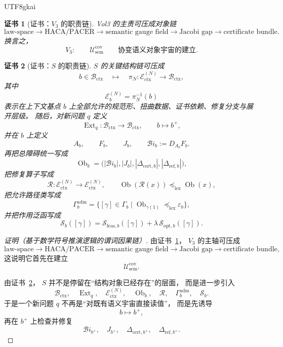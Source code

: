 \documentclass[12pt]{article}
\newtheorem{Certificate}{证书}[section]
\begin{document}
\begin{CJK*}{UTF8}{gkai}
\begin{Certificate}[证书：$V_3$ 的职责链]
\label{cert:tex37-ch20-v3-role}
Vol3 的主责可压成对象链
\[
  \text{law-space}
  \to
  \text{HACA/PACER}
  \to
  \text{semantic gauge field}
  \to
  \text{Jacobi gap}
  \to
  \text{certificate bundle}.
\]
换言之，
\[
  V_3:
  \qquad
  \mathcal U_{\mathrm{sem}}^{\mathrm{cov}}
  \qquad
  \text{协变语义对象宇宙的建立}.
\]
\end{Certificate}

\begin{Certificate}[证书：$S$ 的职责链]
\label{cert:tex37-ch20-s-role}
$S$ 的关键结构链可压成
\[
  b\in\mathcal B_{\mathrm{ctx}}
  \quad\mapsto\quad
  \pi_N:\mathcal E_{\mathrm{ctx}}^{(N)}\to\mathcal B_{\mathrm{ctx}},
\]
其中
\[
  \mathcal E_b^{(N)}=\pi_N^{-1}(b)
\]
表示在上下文基点 $b$ 上全部允许的规范形、扭曲数据、证书依赖、修复分支与展开层级。
随后，对新问题 $q$ 定义
\[
  \operatorname{Ext}_q:\mathcal B_{\mathrm{ctx}}\to \mathcal B_{\mathrm{ctx}},
  \qquad
  b\mapsto b^+,
\]
并在 $b$ 上定义
\[
  A_b,\qquad
  F_b,\qquad
  J_b,\qquad
  \mathcal{B}\!i_b:=D_{A_b}F_b.
\]
再把总障碍统一写成
\[
  \operatorname{Ob}_b
  =
  \bigl(
    |\mathcal{B}\!i_b|,
    |J_b|,
    |\Delta_{\mathrm{cert},b}|,
    |\Delta_{\mathrm{ref},b}|
  \bigr),
\]
把修复算子写成
\[
  \mathcal R:\mathcal E_{\mathrm{ctx}}^{(N)}\to \mathcal E_{\mathrm{ctx}}^{(N)},
  \qquad
  \operatorname{Ob}(\mathcal R(x))
  \preceq_{\mathrm{lex}}
  \operatorname{Ob}(x),
\]
把允许路径类写成
\[
  \Gamma_b^{\mathrm{adm}}
  =
  \bigl\{
    [\gamma]\in\Gamma_b
    \mid
    \operatorname{Ob}_{\gamma(1)}
    \preceq_{\mathrm{lex}}
    \varepsilon_b
  \bigr\},
\]
并把作用泛函写成
\[
  \mathcal S_b([\gamma])
  =
  \mathcal S_{\mathrm{feas},b}([\gamma])
  +
  \lambda\,\mathcal S_{\mathrm{opt},b}([\gamma]).
\]
\end{Certificate}

\begin{proof}[证明（基于数学符号推演逻辑的谓词因果链）]
由证书~\ref{cert:tex37-ch20-v3-role}，
$V_3$ 的主轴可压成
\[
  \text{law-space}
  \to
  \text{HACA/PACER}
  \to
  \text{semantic gauge field}
  \to
  \text{Jacobi gap}
  \to
  \text{certificate bundle},
\]
这说明它首先在建立
\[
  \mathcal U_{\mathrm{sem}}^{\mathrm{cov}}.
\]

由证书~\ref{cert:tex37-ch20-s-role}，
$S$ 并不是停留在“结构对象已经存在”的层面，
而是进一步引入
\[
  \mathcal B_{\mathrm{ctx}},
  \quad
  \operatorname{Ext}_q,
  \quad
  \mathcal E_{\mathrm{ctx}}^{(N)},
  \quad
  \operatorname{Ob}_b,
  \quad
  \mathcal R,
  \quad
  \Gamma_b^{\mathrm{adm}},
  \quad
  \mathcal S_b.
\]
于是一个新问题 $q$ 不再是“对既有语义宇宙直接读值”，
而是先诱导
\[
  b\mapsto b^+,
\]
再在 $b^+$ 上检查并修复
\[
  \mathcal{B}\!i_{b^+},\quad
  J_{b^+},\quad
  \Delta_{\mathrm{cert},b^+},\quad
  \Delta_{\mathrm{ref},b^+}.
\]


\end{proof}
\end{CJK*}
\end{document}
